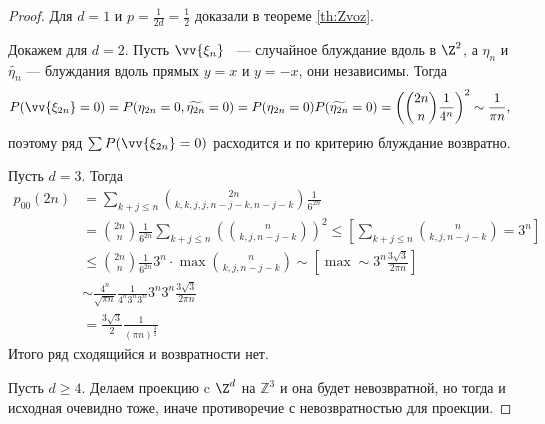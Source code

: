  \begin{proof}
     Для $d = 1$ и $p = \frac{1}{2d} = \frac{1}{2}$ доказали в теореме \ref{th:Zvoz}. 

    Докажем для $d = 2$. Пусть $\vv{\xi_n}$ ~--- случайное блуждание вдоль в $\Z^2$, а $\eta_n$ и $\widetilde{\eta_n}$ --- блуждания вдоль прямых $y=x$ и $y = -x$, они независимы. Тогда
$$P(\vv{\xi_{2n}} = 0)= P(\eta_{2n} = 0, \widetilde{\eta_{2n}} = 0) = P(\eta_{2n} = 0)P( \widetilde{\eta_{2n}} = 0)=
         \left(\binom{2n}{n}\frac{1}{4^n}\right)^2 \sim \frac{1}{\pi n},$$ поэтому ряд $\sum P(\vv{\xi_{2n}} = 0)$ расходится и по критерию блуждание возвратно.

  

        Пусть $d = 3$.
        Тогда
        \begin{align*}
            p_{00}(2n) &= \sum\limits_{k + j \le n} \binom{2n}{k,k,j,j, n - j - k, n-j-k} \frac{1}{6^{2n}} \\&=
         \binom{2n}{n}\frac{1}{6^{2n}}\sum\limits_{k + j\le n}\left(\binom{n}{k,j,n-j-k}\right)^2 \le \left[\sum\limits_{k + j\le n}\binom{n}{k,j,n-j-k} = 3^n\right] \\&\le \binom{2n}{n}\frac{1}{6^{2n}}3^n\cdot\max\binom{n}{k,j,n-j-k} \sim \left[\max \sim 3^n \frac{3\sqrt{3}}{2\pi n}\right] \\&\sim \frac{4^n}{\sqrt{\pi n}}\frac{1}{4^n3^n3^n}3^n3^n\frac{3\sqrt{3}}{2\pi n} \\&= \frac{3\sqrt{3}}{2}\frac{1}{(\pi n)^{\frac{3}{2}}}
        \end{align*}
    Итого ряд сходящийся и возвратности нет.
     
    
     Пусть $d \ge 4$. Делаем проекцию c $\Z^d$ на $\mathbb{Z}^3$ и она будет невозвратной, но тогда и исходная очевидно тоже, иначе противоречие с невозвратностью для проекции.
 \end{proof}

